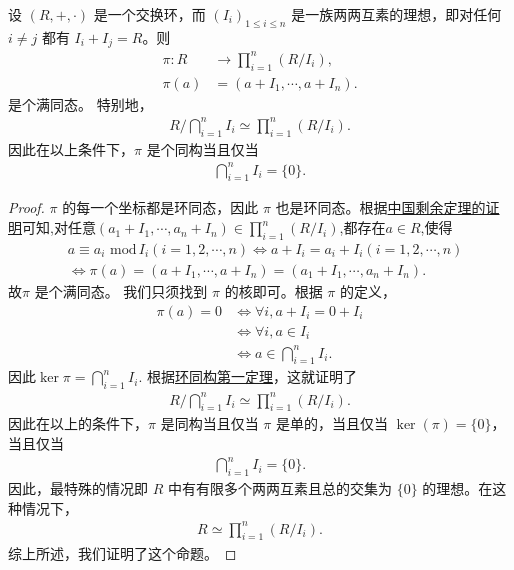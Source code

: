 \documentclass[../../main.tex]{subfiles}
\begin{document}
\begin{proposition}[中国剩余定理推论]\label{proposition:中国剩余定理推论}
设 $(R, +, \cdot)$ 是一个交换环，而 $(I_i)_{1 \leqslant i \leqslant n}$ 是一族两两互素的理想，即对任何 $i \neq j$ 都有 $I_i + I_j = R$。则
\begin{align*}
\pi: R &\to \prod_{i = 1}^n (R / I_i) ,\\
\pi(a) &= (a + I_1, \cdots, a + I_n) .
\end{align*}
是个满同态。
特别地，
\begin{align*}
R \big/ \bigcap_{i = 1}^n I_i \simeq \prod_{i = 1}^n (R / I_i) .
\end{align*}
因此在以上条件下，$\pi$ 是个同构当且仅当
\begin{align*}
\bigcap_{i = 1}^n I_i = \{0\} .
\end{align*}
\end{proposition}
\begin{proof}
$\pi$ 的每一个坐标都是环同态，因此 $\pi$ 也是环同态。根据\hyperref[theorem:中国剩余定理]{中国剩余定理的证明}可知,对任意$(a_1+I_1,\cdots,a_n+I_n)\in \prod_{i = 1}^n (R / I_i)$,都存在$a\in R$,使得
\begin{align*}
&a\equiv a_i\,\,\mathrm{mod}\,I_i\left( i=1,2,\cdots ,n \right) \Longleftrightarrow a+I_i=a_i+I_i\left( i=1,2,\cdots ,n \right) 
\\
&\Longleftrightarrow \pi \left( a \right) =\left( a+I_1,\cdots ,a+I_n \right) =\left( a_1+I_1,\cdots ,a_n+I_n \right)  .
\end{align*}
故$\pi$ 是个满同态。
我们只须找到 $\pi$ 的核即可。根据 $\pi$ 的定义，
\begin{align*}
\pi(a) = 0 &\iff \forall i, a + I_i = 0 + I_i \\
&\iff \forall i, a \in I_i \\
&\iff a \in \bigcap_{i = 1}^n I_i .
\end{align*}
因此$\ker \pi=\bigcap_{i = 1}^n I_i.$
根据\hyperref[theorem:环同构第一定理]{环同构第一定理}，这就证明了
\begin{align*}
R \big/ \bigcap_{i = 1}^n I_i \simeq \prod_{i = 1}^n (R / I_i).
\end{align*}
因此在以上的条件下，$\pi$ 是同构当且仅当 $\pi$ 是单的，当且仅当 $\ker(\pi) = \{0\}$，当且仅当
\begin{align*}
\bigcap_{i = 1}^n I_i = \{0\} .
\end{align*}
因此，最特殊的情况即 $R$ 中有有限多个两两互素且总的交集为 $\{0\}$ 的理想。在这种情况下，
\begin{align*}
R \simeq \prod_{i = 1}^n (R / I_i).
\end{align*}
综上所述，我们证明了这个命题。 

\end{proof}
\end{document}
